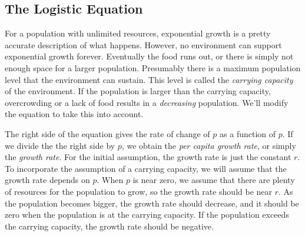 \documentclass{book}
\begin{document}
\subsection{The Logistic Equation}

For a population with unlimited resources, exponential growth
is a pretty accurate description of what happens.
However, no environment can support exponential growth forever.
Eventually the food runs out, or there is simply not enough space
for a larger population.
Presumably there is a maximum population level that the environment
can sustain.  This level is called the
\emph{carrying capacity}
of the environment. If the population is larger than the
carrying capacity, overcrowding or a lack of food results in a
\emph{decreasing} population.
We'll modify the equation to take this into account.

The right side of the equation gives the rate of change of $p$ as a function
of $p$.
If we divide the the right side by $p$, we obtain the
\emph{per capita growth rate},
or simply the \emph{growth rate}.
For the initial assumption,
the growth rate  is just the constant $r$.
To incorporate the assumption of a carrying capacity, we will assume that the
growth rate depends on $p$.  When $p$ is near zero, we assume that there
are plenty of resources for the population to grow, so the growth rate should be
near $r$.  As the population becomes bigger, the growth rate should decrease,
and it should be zero when the population is at the carrying capacity.
If the population exceeds the carrying capacity, the growth rate should
be negative.
\end{document}
